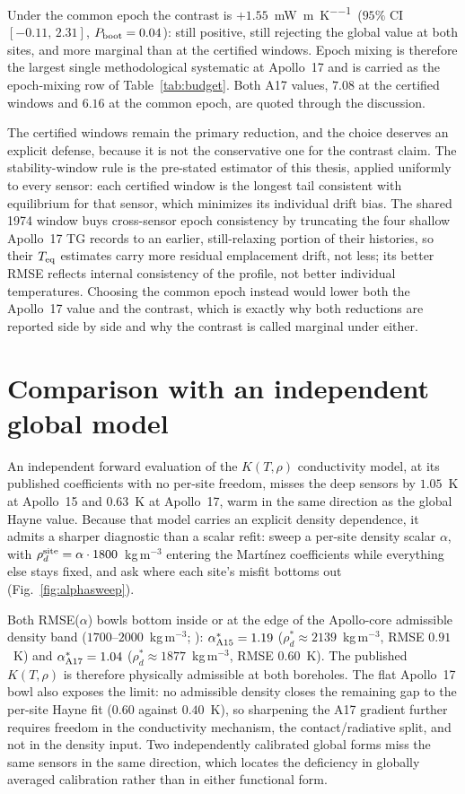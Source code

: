 \documentclass[11pt,a4paper,oneside]{report}
\newcommand{\mWmK}{\si{\milli\watt\per\meter\per\kelvin}}
\begin{document}
Under the common epoch the contrast is $+1.55$~\mWmK\ ($95\%$ CI
$[-0.11,\,2.31]$, $P_{\rm boot}=0.04$): still positive, still
rejecting the global value at both sites, and more marginal than at
the certified windows. Epoch mixing is therefore the largest single
methodological systematic at Apollo~17 and is carried as the
epoch-mixing row of Table~\ref{tab:budget}. Both A17 values, $7.08$
at the certified windows and $6.16$ at the common epoch, are quoted
through the discussion.

The certified windows remain the primary reduction, and the choice
deserves an explicit defense, because it is not the conservative one
for the contrast claim. The stability-window rule is the pre-stated
estimator of this thesis, applied uniformly to every sensor: each
certified window is the longest tail consistent with equilibrium for
that sensor, which minimizes its individual drift bias. The shared
1974 window buys cross-sensor epoch consistency by truncating the
four shallow Apollo~17 TG records to an earlier, still-relaxing
portion of their histories, so their $T_{\rm eq}$ estimates carry
more residual emplacement drift, not less; its better RMSE reflects
internal consistency of the profile, not better individual
temperatures. Choosing the common epoch instead would lower both the
Apollo~17 value and the contrast, which is exactly why both
reductions are reported side by side and why the contrast is called
marginal under either.

\section{Comparison with an independent global model}\label{sec:secondmodel}
An independent forward evaluation of the \citet{martinez2021}
$K(T,\rho)$ conductivity model, at its published coefficients with no
per-site freedom, misses the deep sensors by $1.05$~K at Apollo~15
and $0.63$~K at Apollo~17, warm in the same direction as the global
Hayne value. Because that model carries an explicit density
dependence, it admits a sharper diagnostic than a scalar refit: sweep
a per-site density scalar $\alpha$, with
$\rho_d^{\rm site}=\alpha\cdot1800$~kg\,m$^{-3}$ entering the
Mart\'inez coefficients while everything else stays fixed, and ask
where each site's misfit bottoms out (Fig.~\ref{fig:alphasweep}).

Both RMSE($\alpha$) bowls bottom inside or at the edge of the
Apollo-core admissible density band ($1700$--$2000$~kg\,m$^{-3}$;
\citealp{mitchell1973,carrier1991}): $\alpha^*_{\rm A15}=1.19$
($\rho_d^*\approx2139$~kg\,m$^{-3}$, RMSE $0.91$~K) and
$\alpha^*_{\rm A17}=1.04$ ($\rho_d^*\approx1877$~kg\,m$^{-3}$, RMSE
$0.60$~K). The published $K(T,\rho)$ is therefore physically
admissible at both boreholes. The flat Apollo~17 bowl also exposes
the limit: no admissible density closes the remaining gap to the
per-site Hayne fit ($0.60$ against $0.40$~K), so sharpening the A17
gradient further requires freedom in the conductivity mechanism, the
contact/radiative split, and not in the density input. Two
independently calibrated global forms miss the same sensors in the
same direction, which locates the deficiency in globally averaged
calibration rather than in either functional form.
\end{document}
